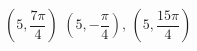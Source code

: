 { $\left( 5, \dfrac{7\pi}{4} \right)$}
{$\left( 5, -\dfrac{\pi}{4} \right), \, \left( 5, \dfrac{15\pi}{4} \right)$\\ }
